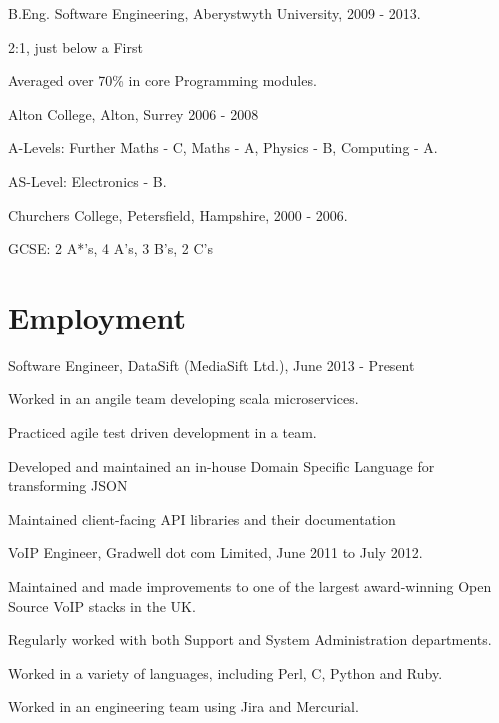 \documentclass[a4paper]{article}
\renewenvironment{itemize}{
  \begin{list}{}{
    \setlength{\leftmargin}{1.5em}
  }
}{
  \end{list}
}
\newenvironment{packed}{
\begin{itemize}
  \setlength{\itemsep}{0pt}
  \setlength{\parskip}{0pt}
  \setlength{\parsep}{0pt}
}{\end{itemize}}
\begin{document}
\begin{itemize}
  \item B.Eng. Software Engineering, Aberystwyth University, 2009 - 2013.
	\begin{packed}
	\item 2:1, just below a First
	\item Averaged over 70\% in core Programming modules.
	\end{packed}

  \item Alton College, Alton, Surrey 2006 - 2008
	\begin{packed}
	\item A-Levels: Further Maths - C, Maths - A, Physics - B, Computing - A.
	\item AS-Level: Electronics - B.
	\end{packed}

  \item Churchers College, Petersfield, Hampshire, 2000 - 2006.
	\begin{packed}
	\item 	GCSE: 2 A*'s, 4 A's, 3 B's, 2 C's
	\end{packed}
\end{itemize}


\section*{Employment}

\begin{itemize}
\item Software Engineer, DataSift (MediaSift Ltd.), June 2013 - Present
        \begin{packed}
            \item Worked in an angile team developing scala microservices.
            \item Practiced agile test driven development in a team.
            \item Developed and maintained an in-house Domain Specific Language for transforming JSON
            \item Maintained client-facing API libraries and their documentation
        \end{packed}
\end{itemize}

\begin{itemize}
\item VoIP Engineer, Gradwell dot com Limited, June 2011 to July 2012.
        \begin{packed}
            \item Maintained and made improvements to one of the largest award-winning Open Source VoIP stacks in the UK.
            \item Regularly worked with both Support and System Administration departments.
            \item Worked in a variety of languages, including Perl, C, Python and Ruby.
            \item Worked in an engineering team using Jira and Mercurial.
        \end{packed}
\end{itemize}
\end{document}
